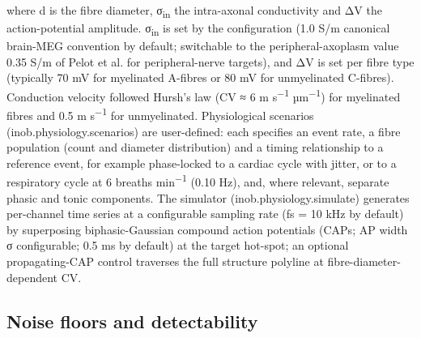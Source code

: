 \documentclass[11pt]{article}
\begin{document}
where d is the fibre diameter, σ\textsubscript{in} the intra-axonal
conductivity and ΔV the action-potential amplitude. σ\textsubscript{in}
is set by the configuration (1.0 S/m canonical brain-MEG convention by
default; switchable to the peripheral-axoplasm value 0.35 S/m of Pelot
et al. for peripheral-nerve targets), and ΔV is set per fibre type
(typically 70 mV for myelinated A-fibres or 80 mV for unmyelinated
C-fibres). Conduction velocity followed Hursh's law (CV
≈ 6 m s\textsuperscript{−1} µm\textsuperscript{−1}) for myelinated
fibres and 0.5 m s\textsuperscript{−1} for unmyelinated. Physiological
scenarios (inob.physiology.scenarios) are user-defined: each specifies
an event rate, a fibre population (count and diameter distribution) and
a timing relationship to a reference event, for example phase-locked to
a cardiac cycle with jitter, or to a respiratory cycle at 6 breaths
min\textsuperscript{−1} (0.10 Hz), and, where relevant, separate phasic
and tonic components. The simulator (inob.physiology.simulate) generates
per-channel time series at a configurable sampling rate (fs = 10 kHz by
default) by superposing biphasic-Gaussian compound action potentials
(CAPs; AP width σ configurable; 0.5 ms by default) at the target
hot-spot; an optional propagating-CAP control traverses the full
structure polyline at fibre-diameter-dependent CV.

\subsection{Noise floors and
detectability}\label{noise-floors-and-detectability}
\end{document}
